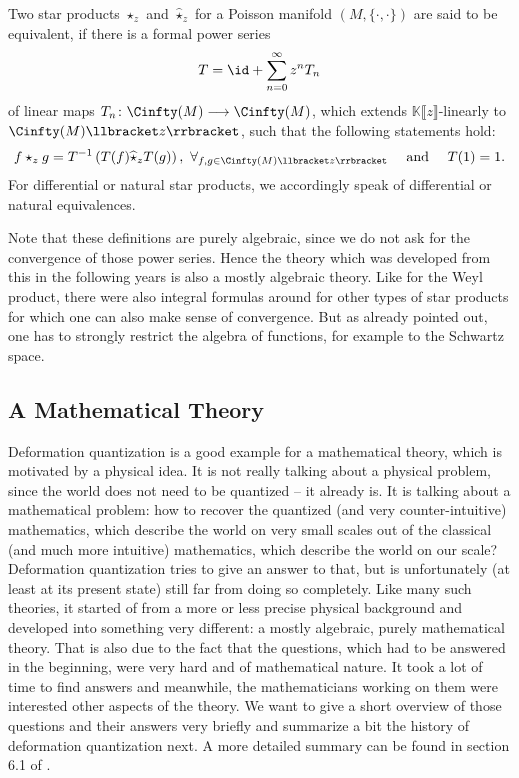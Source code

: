 \begin{definition}
	Two star products $\star_z$ and $\widehat{\star}_z$ for a Poisson manifold 
	$(M, \{\cdot, \cdot\})$ are said to be equivalent, if there is a formal 
	power series
	\begin{equation*}
		T
		=
		\id +
		\sum\limits_{n=0}^{\infty}
		z^n T_n
	\end{equation*}
	of linear maps $T_n \colon \Cinfty(M) \longrightarrow \Cinfty(M)$, which 
	extends $\mathbb{K}\llbracket z \rrbracket$-linearly to 
	$\Cinfty(M) \llbracket z \rrbracket$, such that the following statements hold:
	\begin{equation*}
		f \star_z g
		=
		T^{-1}
		\left(
			T(f) \widehat{\star}_z T(g)
		\right)
		, \ 
		\forall_{f,g \in \Cinfty(M) \llbracket z \rrbracket}
		\quad \text{ and } \quad
		T(1) 
		= 
		1.
	\end{equation*}
	For differential or natural star products, we accordingly speak of 
	differential or 	natural equivalences.
\end{definition}
Note that these definitions are purely algebraic, since we do not ask for the
convergence of those power series. Hence the theory which was developed from 
this in the following years is also a mostly algebraic theory. Like for the Weyl 
product, there were also integral formulas around for other types of star products 
for which one can also make sense of convergence. But as already pointed out, one 
has to strongly restrict the algebra of functions, for example to the Schwartz 
space.



\subsection{A Mathematical Theory}
\label{subsec:chap2_MathTheory}
Deformation quantization is a good example for a mathematical theory, which is 
motivated by a physical idea. It is not really talking about a physical problem, 
since the world does not need to be quantized -- it already is. It is talking 
about a mathematical problem: how to recover the quantized (and very 
counter-intuitive) mathematics, which describe the world on very small scales out 
of the classical (and much more intuitive) mathematics, which describe the world 
on our scale? Deformation quantization tries to give an answer to that, but is 
unfortunately (at least at its present state) still far from doing so completely. 
Like many such theories, it started of from a more or less precise physical 
background and developed into something very different: a mostly algebraic, purely 
mathematical theory. That is also due to the fact that the questions, which had to 
be answered in the beginning, were very hard and of mathematical nature. It took a 
lot of time to find answers and meanwhile, the mathematicians working on them
were interested other aspects of the theory. We want to give a short overview of
those questions and their answers very briefly and summarize a bit the history of 
deformation quantization next. A more detailed summary can be found in section 6.1 
of \cite{waldmann:2007a}.


